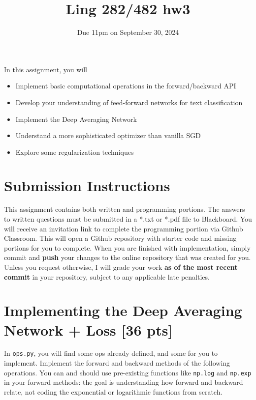 \documentclass[11pt]{article}
\begin{document}
\title{Ling 282/482 hw3}
\date{\vspace{-0.2in}Due 11pm on September 30, 2024}
\maketitle


\noindent In this assignment, you will 
\begin{itemize}
  \item Implement basic computational operations in the forward/backward API
  \item Develop your understanding of feed-forward networks for text classification
  \item Implement the Deep Averaging Network
  \item Understand a more sophisticated optimizer than vanilla SGD
  \item Explore some regularization techniques
\end{itemize}

\section*{Submission Instructions}
This assignment contains both written and programming portions. The answers to written questions must be submitted in a *.txt or *.pdf file to Blackboard. You will receive an invitation link to complete the programming portion via Github Classroom. This will open a Github repository with starter code and missing portions for you to complete. When you are finished with implementation, simply commit and \textbf{push} your changes to the online repository that was created for you. Unless you request otherwise, I will grade your work \textbf{as of the most recent commit} in your repository, subject to any applicable late penalties.

\section{Implementing the Deep Averaging Network + Loss [36 pts]}

 In \texttt{ops.py}, you will find some ops already defined, and some for you to implement. Implement the forward and backward methods of the following operations. You can and should use pre-existing functions like \texttt{np.log} and \texttt{np.exp} in your forward methods: the goal is understanding how forward and backward relate, not coding the exponential or logarithmic functions from scratch.
\end{document}
